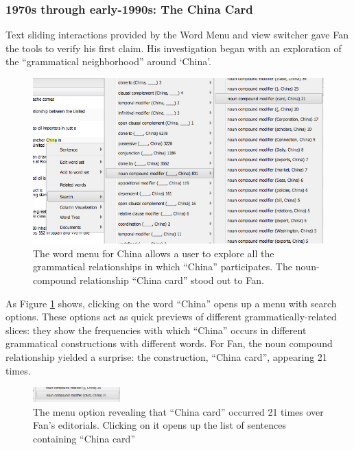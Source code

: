 \documentclass{sig-alternate}
\begin{document}
\subsubsection{1970s through early-1990s: The China Card}
Text sliding interactions provided by the Word Menu and view switcher gave Fan the tools to verify his first claim. His investigation began with an exploration of the ``grammatical neighborhood'' around `China'.

\begin{figure}[h!]
\includegraphics[width=\textwidth]{fig/chris/01.png}
\caption{The word menu for China allows a user to explore all the grammatical relationships in which ``China'' participates. The noun-compound relationship ``China card'' stood out to Fan. \label{fig:chris01}}
\end{figure}

As Figure \ref{fig:chris01} shows, clicking on the word ``China'' opens up a menu with search options. These options act as quick previews of different grammatically-related slices: they show the frequencies with which ``China'' occurs in different grammatical constructions with different words.  For Fan, the noun compound relationship yielded a surprise: the construction, ``China card'', appearing 21 times.

\begin{figure}[h!]
\includegraphics[width=0.3\textwidth]{fig/chris/01b.png}
\caption{ The menu option revealing that ``China card'' occurred 21 times over Fan's editorials. Clicking on it opens up the list of sentences containing ``China card''  \label{fig:chris01b}}
\end{figure}
\end{document}
